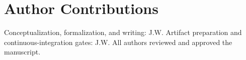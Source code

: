 \documentclass[aps,prd,twocolumn,superscriptaddress,nofootinbib,floatfix,longbibliography]{revtex4-2}
\begin{document}
\section*{Author Contributions}
Conceptualization, formalization, and writing: J.W. Artifact preparation and continuous-integration gates: J.W. All authors reviewed and approved the manuscript.



\end{document}
